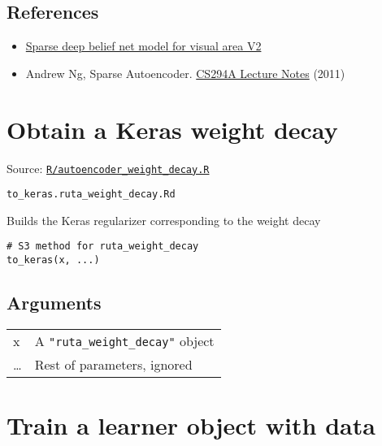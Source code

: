 \hypertarget{references}{\subsection{\texorpdfstring{\protect\hyperlink{references}{}References}{References}}\label{references}}

\begin{itemize}
\item
  \href{http://papers.nips.cc/paper/3313-sparse-deep-belief-net-model-for-visual-area-v2}{Sparse
  deep belief net model for visual area V2}
\item
  Andrew Ng, Sparse Autoencoder.
  \href{https://web.stanford.edu/class/cs294a/sparseAutoencoder_2011new.pdf}{CS294A
  Lecture Notes} (2011)
\end{itemize}

\section{Obtain a Keras weight decay}\label{obtain-a-keras-weight-decay}

Source:
\href{https://github.com/fdavidcl/ruta/blob/master/R/autoencoder_weight_decay.R}{\texttt{R/autoencoder\_weight\_decay.R}}

\texttt{to\_keras.ruta\_weight\_decay.Rd}

Builds the Keras regularizer corresponding to the weight decay

\begin{verbatim}
# S3 method for ruta_weight_decay
to_keras(x, ...)
\end{verbatim}

\hypertarget{arguments}{\subsection{\texorpdfstring{\protect\hyperlink{arguments}{}Arguments}{Arguments}}\label{arguments}}

\begin{longtable}[c]{@{}ll@{}}
\toprule
x & A \texttt{"ruta\_weight\_decay"} object\tabularnewline
\ldots{} & Rest of parameters, ignored\tabularnewline
\bottomrule
\end{longtable}

\section{Train a learner object with
data}\label{train-a-learner-object-with-data}

